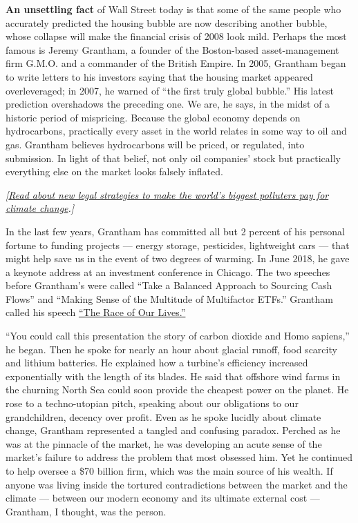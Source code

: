 \textbf{An unsettling fact} of Wall Street today is that some of the
same people who accurately predicted the housing bubble are now
describing another bubble, whose collapse will make the financial crisis
of 2008 look mild. Perhaps the most famous is Jeremy Grantham, a founder
of the Boston-based asset-management firm G.M.O. and a commander of the
British Empire. In 2005, Grantham began to write letters to his
investors saying that the housing market appeared overleveraged; in
2007, he warned of ``the first truly global bubble.'' His latest
prediction overshadows the preceding one. We are, he says, in the midst
of a historic period of mispricing. Because the global economy depends
on hydrocarbons, practically every asset in the world relates in some
way to oil and gas. Grantham believes hydrocarbons will be priced, or
regulated, into submission. In light of that belief, not only oil
companies' stock but practically everything else on the market looks
falsely inflated.

\emph{{[}\href{https://www.nytimes3xbfgragh.onion/interactive/2019/04/09/magazine/climate-change-peru-law.html}{Read
about new legal strategies to make the world's biggest polluters pay for
climate change}.{]}}

In the last few years, Grantham has committed all but 2 percent of his
personal fortune to funding projects --- energy storage, pesticides,
lightweight cars --- that might help save us in the event of two degrees
of warming. In June 2018, he gave a keynote address at an investment
conference in Chicago. The two speeches before Grantham's were called
``Take a Balanced Approach to Sourcing Cash Flows'' and ``Making Sense
of the Multitude of Multifactor ETFs.'' Grantham called his speech
\href{https://www.morningstar.com/videos/870606/watch-jeremy-granthams-race-of-our-lives-speech.html}{``The
Race of Our Lives.''}

``You could call this presentation the story of carbon dioxide and Homo
sapiens,'' he began. Then he spoke for nearly an hour about glacial
runoff, food scarcity and lithium batteries. He explained how a
turbine's efficiency increased exponentially with the length of its
blades. He said that offshore wind farms in the churning North Sea could
soon provide the cheapest power on the planet. He rose to a
techno-utopian pitch, speaking about our obligations to our
grandchildren, decency over profit. Even as he spoke lucidly about
climate change, Grantham represented a tangled and confusing paradox.
Perched as he was at the pinnacle of the market, he was developing an
acute sense of the market's failure to address the problem that most
obsessed him. Yet he continued to help oversee a \$70 billion firm,
which was the main source of his wealth. If anyone was living inside the
tortured contradictions between the market and the climate --- between
our modern economy and its ultimate external cost --- Grantham, I
thought, was the person.

